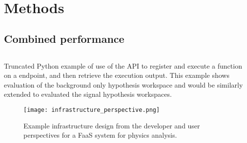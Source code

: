 \section{Methods}\label{sec:methods}
%

%


\subsection{Combined performance}\label{subsec:combination}

\begin{listing}
 \inputminted{python}{src/code/funcX_registration_example.py}
 \caption{Truncated Python example of use of the \funcX{} API to register and execute a \pyhf{} function on a \funcX{} endpoint, and then retrieve the execution output.
 This example shows evaluation of the background only hypothesis workspace and would be similarly extended to evaluated the signal hypothesis workspaces.}
 \label{lst:funcX_registration_example}
\end{listing}

%
\begin{figure}[!htpb]
    \centering
    \texttt{[image: infrastructure\_perspective.png]}
    \caption{Example infrastructure design from the developer and user perspectives for a FaaS system for physics analysis.~\cite{portable_inference_workshop}}
    \label{fig:infrastructure_perspective}
\end{figure}
